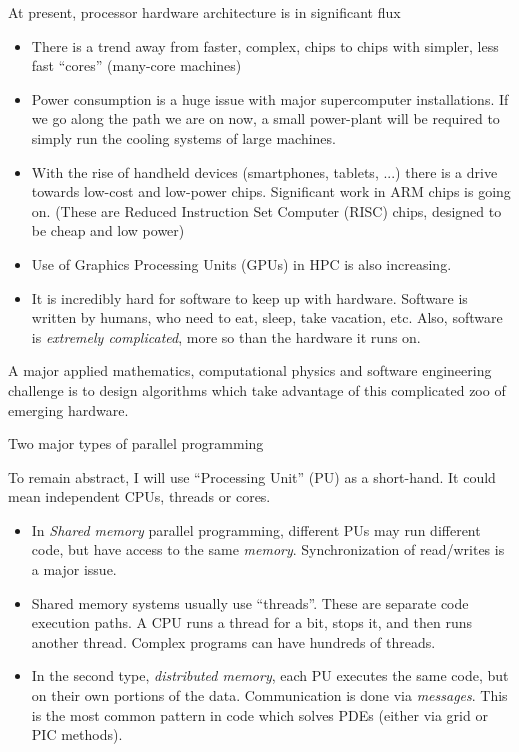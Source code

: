 \documentclass[aspectratio=169]{beamer}
\newcommand{\mypause}{}
\begin{document}
\begin{frame}{At present, processor hardware architecture is in
    significant flux}
  \footnotesize%
  \begin{itemize}
  \item There is a trend away from faster, complex, chips to chips
    with simpler, less fast ``cores'' (many-core machines)
  \item Power consumption is a huge issue with major supercomputer
    installations. If we go along the path we are on now, a small
    power-plant will be required to simply run the cooling systems of
    large machines.
  \item With the rise of handheld devices (smartphones, tablets, ...)
    there is a drive towards low-cost and low-power chips. Significant
    work in ARM chips is going on. (These are Reduced Instruction Set
    Computer (RISC) chips, designed to be cheap and low power)
  \item Use of Graphics Processing Units (GPUs) in HPC is also
    increasing.
  \item It is incredibly hard for software to keep up with
    hardware. Software is written by humans, who need to eat, sleep,
    take vacation, etc. Also, software is \emph{extremely
      complicated}, more so than the hardware it runs on.
  \end{itemize}
  {\color{blue} A major applied mathematics, computational physics and
    software engineering challenge is to design algorithms which take
    advantage of this complicated zoo of emerging hardware.}

\end{frame}

\begin{frame}{Two major types of parallel programming}

  To remain abstract, I will use ``Processing Unit'' (PU) as a
  short-hand. It could mean independent CPUs, threads or cores.
  \begin{itemize}
  \item In \emph{Shared memory} parallel programming, different PUs
    may run different code, but have access to the same
    \emph{memory}. Synchronization of read/writes is a major
    issue.
  \item Shared memory systems usually use ``threads''. These are
    separate code execution paths. A CPU runs a thread for a bit, stops
    it, and then runs another thread. Complex programs can have
    hundreds of threads. %
    \mypause%
  \item In the second type, \emph{distributed memory}, each PU
    executes the same code, but on their own portions of the
    data. Communication is done via \emph{messages}. This is the most
    common pattern in code which solves PDEs (either via grid or PIC
    methods).
  \end{itemize}  
\end{frame}
\end{document}
